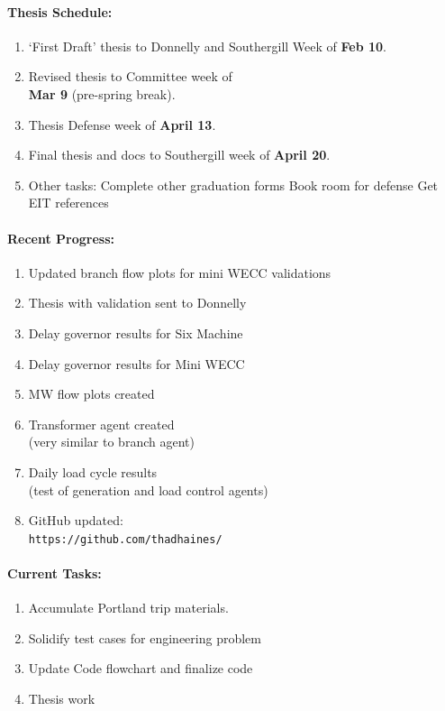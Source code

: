 \documentclass[12pt]{article}
\begin{document}
\begin{multicols}{2}
\raggedright
	\paragraph{Thesis Schedule:}
	\begin{enumerate}
\itemsep0em 
		\item `First Draft' thesis to Donnelly and Southergill Week of\textbf{ Feb 10}.
		\item Revised thesis to Committee week of \\ \textbf{Mar 9} (pre-spring break).
		\item Thesis Defense week of \textbf{April 13}.
		\item Final thesis and docs to Southergill week of \textbf{April 20}.
\item Other tasks:
\subitem Complete other graduation forms
\subitem Book room for defense
\subitem Get EIT references
\end{enumerate}

	\paragraph{Recent Progress:}
	\begin{enumerate}
\itemsep0em 
\item Updated branch flow plots for mini WECC validations
\item Thesis with validation sent to Donnelly
\item Delay governor results for Six Machine
\item Delay governor results for Mini WECC
\item MW flow plots created
\item Transformer agent created \\ (very similar to branch agent)
\item Daily load cycle results \\ (test of generation and load control agents)

		\item GitHub updated:\\
		\verb|https://github.com/thadhaines/ |

\vfill\null
\columnbreak
	
	\end{enumerate}
\paragraph{Current Tasks:}
	\begin{enumerate}
		\itemsep0em 
		\item Accumulate Portland trip materials.
		\item Solidify test cases for engineering problem
		\item Update Code flowchart and finalize code%
		\item Thesis work 


\end{enumerate}
\end{multicols}
\end{document}
